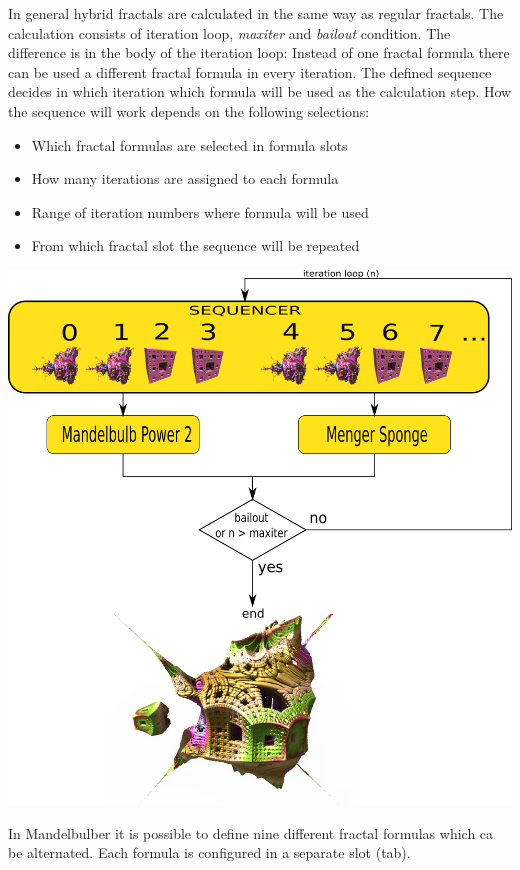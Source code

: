 In general hybrid fractals are calculated in the same way as regular fractals.
The calculation consists of iteration loop, \emph{maxiter} and \emph{bailout} condition. The
difference is in the body of the iteration loop: Instead of one fractal formula there
can be used a different fractal formula in every iteration. The defined
sequence decides in which iteration which formula will be used as the calculation step.
How the sequence will work depends on the following selections:
\begin{itemize}
    \item Which fractal formulas are selected in formula slots
	\item How many iterations are assigned to each formula
	\item Range of iteration numbers where formula will be used
	\item From which fractal slot the sequence will be repeated
\end{itemize}

\includegraphics[width=\linewidth]{img/manual/media/iteration_loop_hybrid.png}

In Mandelbulber it is possible to define nine different fractal formulas which
ca be alternated. Each formula is configured in a separate slot (tab).

